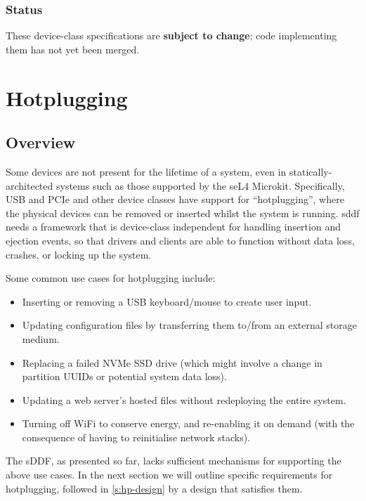 \documentclass[a4paper,12pt]{report}
\begin{document}
\subsection{Status}

These device-class specifications are \textbf{subject to change}; code
implementing them has not yet been merged.

\chapter{Hotplugging}\label{s:hotplugging}

\section{Overview}

Some devices are not present for the lifetime of a system,
even in statically-architected systems such as those supported by the seL4
Microkit. Specifically, USB and PCIe and other device classes have support for ``hotplugging'',
where the physical devices can be removed or inserted whilst the system is running.
\gls{sddf} needs a framework that is device-class independent for handling
insertion and ejection events, so that drivers and clients are able to function
without data loss, crashes, or locking up the system.

Some common use cases for hotplugging include:

\begin{itemize}
  \item Inserting or removing a USB keyboard/mouse to create user input.

  \item Updating configuration files by transferring them to/from an external storage medium.

  \item Replacing a failed NVMe SSD drive (which might involve a change in partition UUIDs
        or potential system data loss).

  \item Updating a web server's hosted files without redeploying the entire system.

  \item Turning off WiFi to conserve energy, and re-enabling it on
    demand (with the consequence of having to reinitialise network stacks).
\end{itemize}

The sDDF, as presented so far, lacks sufficient mechanisms for
supporting the above use cases. In the next section we will outline
specific requirements for hotplugging, followed in
\autoref{s:hp-design} by a design that satisfies them.
\end{document}
